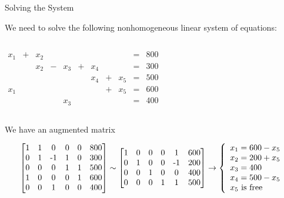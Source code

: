 \documentclass[xcolor=dvipsnames,aspectratio=169,t]{beamer}
\begin{document}
\begin{frame}{Solving the System}

  We need to solve the following nonhomogeneous linear system of equations:

  \begin{columns}[T]
    \column{0.3\tw}
    
    \hspace*{2em}\scalebox{0.65}{}
    
      \column{0.7\tw}
\[   \begin{array}{ccccccccccc}
    x_1 & + & x_2 &   &         &    &        &   &          &= & 800\\
           &     & x_2 & - & x_3 & + & x_4 &   &         &=& 300\\
           &     &        &    &        &    & x_4 & + & x_5 &=& 500\\
    x_1 &     &        &    &       &     &        & + & x_5 &=& 600\\
           &      &        &   & x_3 &    &        &     &        &=& 400
\end{array} \]

\end{columns}
  \medskip

   We have an augmented matrix

   \[ \bbm
   $1$ & $1$ & $0$ & $0$ & $0$ & $800$\\
   $0$ & $1$ & $-1$ & $1$ & $0$ & $300$\\
   $0$ & $0$ & $0$ & $1$ & $1$ & $500$\\
   $1$ & $0$ & $0$ & $0$ & $1$ & $600$\\
   $0$ & $0$ & $1$ & $0$ & $0$ & $400$
   \ebm
   \sim
   \bbm
   $1$ & $0$ & $0$ & $0$ & $1$ & $600$\\
   $0$ & $1$ & $0$ & $0$ & $-1$ & $200$\\
   $0$ & $0$ & $1$ & $0$ & $0$ & $400$\\
   $0$ & $0$ & $0$ & $1$ & $1$ & $500$\\
   \ebm
   \rightarrow
   \left\{ \begin{array}{l}
     x_1=600-x_5\\
     x_2 = 200 + x_5\\
     x_3 = 400\\
     x_4 = 500-x_5\\
     x_5 \mbox{ is free}
     \end{array} \right.
   \]

\end{frame}

  
\end{document}
